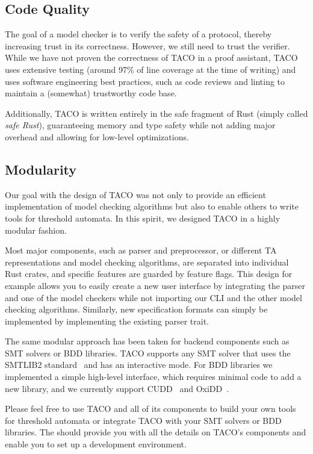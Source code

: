 \documentclass{article}
\begin{document}
    \subsection{Code Quality}
    The goal of a model checker is to verify the safety of a protocol, thereby increasing trust in its correctness.
    However, we still need to trust the verifier.
    While we have not proven the correctness of TACO in a proof assistant, TACO uses extensive testing (around 97\% of line coverage at the time of writing) and uses software engineering best practices, such as code reviews and linting to maintain a (somewhat) trustworthy code base. 

    Additionally, TACO is written entirely in the safe fragment of Rust (simply called \emph{safe Rust}), guaranteeing memory and type safety while not adding major overhead and allowing for low-level optimizations.

    
    \subsection{Modularity}
    Our goal with the design of TACO was not only to provide an efficient implementation of model checking algorithms but also to enable others to write tools for threshold automata. 
    In this spirit, we designed TACO in a highly modular fashion. 

    Most major components, such as parser and preprocessor, or different TA representations and model checking algorithms, are separated into individual Rust crates, and specific features are guarded by feature flags.
    This design for example allows you to easily create a new user interface by integrating the parser and one of the model checkers while not importing our CLI and the other model checking algorithms.
    Similarly, new specification formats can simply be implemented by implementing the existing parser trait.

    The same modular approach has been taken for backend components such as SMT solvers or BDD libraries.
    TACO supports any SMT solver that uses the SMTLIB2 standard~\citep{barrett2010smt} and has an interactive mode.
    For BDD libraries we implemented a simple high-level interface, which requires minimal code to add a new library, and we currently support CUDD~\citep{cudd} and OxiDD~\citep{oxidd24}.

    Please feel free to use TACO and all of its components to build your own tools for threshold automata or integrate TACO with your SMT solvers or BDD libraries. The \href{./dev-docs.md}{} should provide you with all the details on TACO's components and enable you to set up a development environment.

    
    
\end{document}
